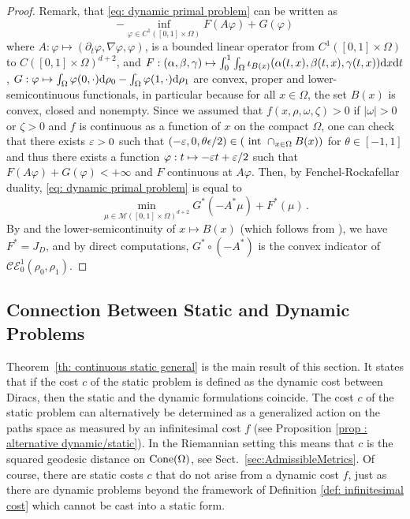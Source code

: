 \begin{proof}
Remark, that \eqref{eq: dynamic primal problem} can be written as 
\[
- \inf_{\varphi \in C^1([0,1] \times \Omega)} F(A\varphi) + G(\varphi)
\]
where
$A : \varphi \mapsto (\partial_t \varphi, \nabla \varphi, \varphi)$, is a bounded linear operator from $C^1([0,1]\times \Omega)$ to $C([0,1]\times \Omega)^{d+2}$, and
$F :(\alpha,\beta,\gamma) \mapsto \int_0^1 \int_{\Omega} \iota_{B(x)}(\alpha(t,x),\beta(t,x),\gamma(t,x)) \mathrm{d} x \mathrm{d} t $,
$ G : \varphi \mapsto \int_{\Omega} \varphi(0,\cdot)\mathrm{d}\rho_0 - \int_{\Omega} \varphi(1,\cdot) \mathrm{d}\rho_1$ are convex, proper and lower-semicontinuous functionals, in particular because for all $x\in \Omega$, the set $B(x)$ is convex, closed and nonempty.
%
Since we assumed that $f(x,\rho,\omega,\zeta)>0$ if $|\omega|>0$ or $\zeta>0$ and $f$ is continuous as a function of $x$ on the compact $\Omega$, one can check that there exists $\varepsilon>0$ such that $(-\varepsilon,0,\theta \epsilon/2) \in \left( \textnormal{ int } \cap_{x\in \Omega} B(x)\right)$ for $\theta\in [-1,1]$ and thus there exists a function $\varphi : t \mapsto -\varepsilon t +\varepsilon/2$ such that $F(A\varphi) + G(\varphi)<+\infty$ and $F$ continuous at $A\varphi$. Then, by Fenchel-Rockafellar duality, \eqref{eq: dynamic primal problem} is equal to
\[
\min_{\mu \in \mathcal{M}([0,1]\times \Omega)^{d+2}}  G^*(-A^*\mu) + F^*(\mu) \, .
\]
By \cite[Theorem 6]{rockafellar1971integrals} and the lower-semicontinuity of $x\mapsto B(x)$ (which follows from \cite[Lemma A.2]{bouchitte1988integral}), we have $F^*=J_D$, and by direct computations, $G^*\circ (-A^*)$ is the convex indicator of $\mathcal{CE}_0^1(\rho_0,\rho_1)$. 
\end{proof}

\subsection{Connection Between Static and Dynamic Problems}

Theorem~\ref{th: continuous static general} is the main result of this section. It states that if the cost $c$ of the static problem is defined as the dynamic cost between Diracs, then the static and the dynamic formulations coincide. 
%
The cost $c$ of the static problem can alternatively be determined as a generalized action on the paths space as measured by an infinitesimal cost $f$ (see Proposition \ref{prop : alternative dynamic/static}).
%
In the Riemannian setting this means that $c$ is the squared geodesic distance on $\operatorname{Cone}(\Omega)$, see Sect.~\ref{sec:AdmissibleMetrics}.
%
Of course, there are static costs $c$ that do not arise from a dynamic cost $f$, just as there are dynamic problems beyond the framework of Definition \ref{def: infinitesimal cost} which cannot be cast into a static form.

